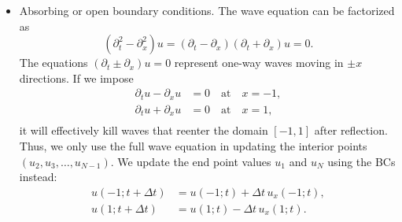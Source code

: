 \documentclass[11pt]{article}
\begin{document}
\begin{itemize}
  \item Absorbing or open boundary conditions.
    The wave equation can be factorized as
    \begin{equation}
      \left(\partial_{t}^{2} - \partial_{x}^{2}\right)u = \left(\partial_{t} - \partial_{x}\right)\left(\partial_{t} + \partial_{x}\right)u = 0.
    \end{equation}
    The equations $(\partial_{t} \pm \partial_{x})u = 0$ represent one-way waves moving in $\pm x$ directions.
    If we impose
    \begin{equation}
      \begin{aligned}
        \partial_{t}u - \partial_{x}u &= 0 \quad\text{at}\quad x = -1,\\
        \partial_{t}u + \partial_{x}u &= 0 \quad\text{at}\quad x = 1,\\
      \end{aligned}
    \end{equation}
    it will effectively kill waves that reenter the domain $[-1, 1]$ after reflection.
    Thus, we only use the full wave equation in updating the interior points $(u_{2}, u_{3}, \ldots, u_{N-1})$.  
    We update the end point values $u_{1}$ and $u_{N}$ using the BCs instead:
    \begin{equation}
      \begin{aligned}
        u(-1; t + \Delta t) &= u(-1; t) + \Delta t\,u_{x}(-1; t),\\
        u(1; t + \Delta t) &= u(1; t) - \Delta t\,u_{x}(1; t).\\
      \end{aligned}
    \end{equation}

\end{itemize}
\end{document}
